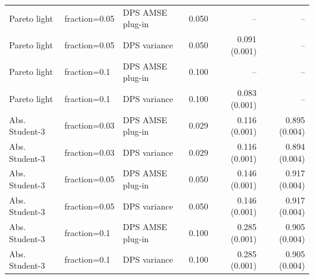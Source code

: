 \begin{tabular}{lllrrr}
Pareto light & fraction=0.05 & DPS AMSE plug-in & 0.050 & -- & -- \\
Pareto light & fraction=0.05 & DPS variance & 0.050 & 0.091 (0.001) & -- \\
Pareto light & fraction=0.1 & DPS AMSE plug-in & 0.100 & -- & -- \\
Pareto light & fraction=0.1 & DPS variance & 0.100 & 0.083 (0.001) & -- \\
Abs. Student-3 & fraction=0.03 & DPS AMSE plug-in & 0.029 & 0.116 (0.001) & 0.895 (0.004) \\
Abs. Student-3 & fraction=0.03 & DPS variance & 0.029 & 0.116 (0.001) & 0.894 (0.004) \\
Abs. Student-3 & fraction=0.05 & DPS AMSE plug-in & 0.050 & 0.146 (0.001) & 0.917 (0.004) \\
Abs. Student-3 & fraction=0.05 & DPS variance & 0.050 & 0.146 (0.001) & 0.917 (0.004) \\
Abs. Student-3 & fraction=0.1 & DPS AMSE plug-in & 0.100 & 0.285 (0.001) & 0.905 (0.004) \\
Abs. Student-3 & fraction=0.1 & DPS variance & 0.100 & 0.285 (0.001) & 0.905 (0.004) \\
\bottomrule
\end{tabular}
